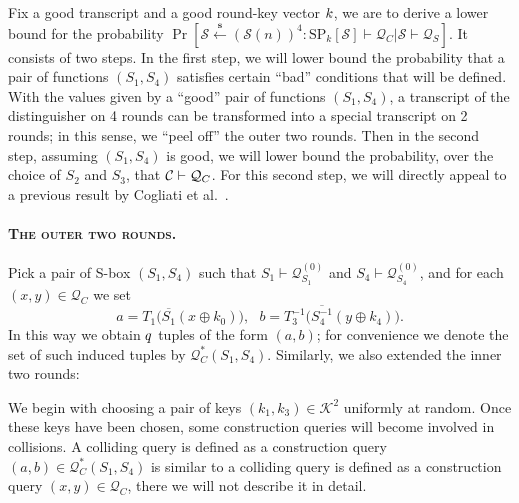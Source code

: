 Fix a good transcript and a good round-key vector $\mathnormal{k}$, we are to derive a lower bound for the probability  $\operatorname{Pr}\left[\mathcal{S} \stackrel{\mathbf{s}}{\leftarrow}(\mathcal{S}(n))^{4}: \mathrm{SP}_{k}[\mathcal{S}] \vdash \mathcal{Q}_{C} | \mathcal{S} \vdash \mathcal{Q}_{S}\right]$. It consists of two steps. In the first step, we will lower bound the probability that a pair of functions $(S_{1}, S_{4})$  satisfies certain ``bad'' conditions that will be defined. With the values given by a ``good'' pair of functions $(S_{1}, S_{4})$, a transcript of the distinguisher on 4 rounds can be transformed into a special transcript on 2 rounds; in this sense, we ``peel off'' the outer two rounds. Then in the second step, assuming $(S_{1}, S_{4})$ is good, we will lower bound the probability, over the choice of $S_2$ and $S_3$, that $\mathcal{C}\vdash\mathcal{Q}_{C}$. For this second step, we will directly appeal to a previous result by
Cogliati et al.~\cite{C:CDKLST18}.





\paragraph{\textsc{The outer two rounds.}} Pick a pair of S-box $(S_1, S_4)$ such that $S_{1} \vdash \mathcal{Q}_{S_{1}}^{(0)}$ and $S_{4} \vdash \mathcal{Q}_{S_{4}}^{(0)}$, and for each $ (x, y) \in \mathcal{Q}_{C}$ we set
%
$$a=T_1\big(\overline{S_1}\left(x \oplus k_{0}\right)\big),\ \ \  b=T_3^{-1}\big(\overline{S_{4}^{-1}}\left(y \oplus k_{4}\right)\big).$$
%
In this way we obtain $\mathnormal{q}$ tuples of the form $(a,b)$; for convenience we denote the set of such induced tuples by $\mathcal{Q}_{C}^{*}\left(S_{1}, S_{4}\right)$. Similarly, we also extended the inner two rounds:


We begin with choosing a pair of keys $\left(k_{1}, k_{3}\right) \in \mathcal{K}^{2}$ uniformly at random. Once these keys have been chosen, some construction queries will become involved in collisions. A colliding query is defined as a construction query $(a, b) \in \mathcal{Q}_{C}^{*}\left(S_{1}, S_{4}\right)$ is similar to a colliding query is defined as a construction query $(x, y) \in \mathcal{Q}_{C}$, there we will not describe it in detail.



